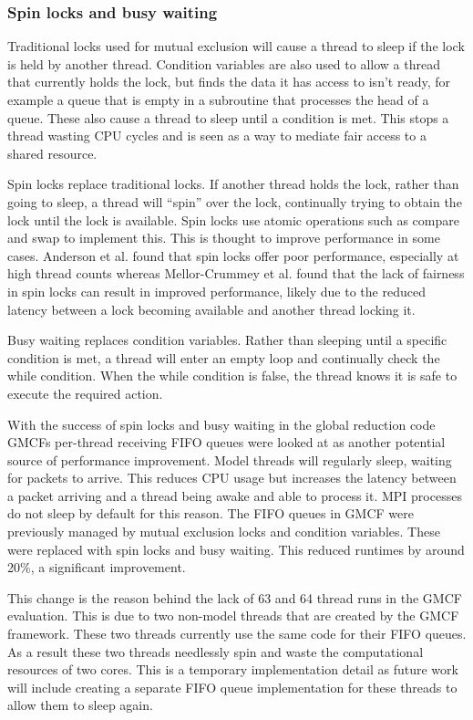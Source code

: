 \subsubsection{Spin locks and busy waiting}

Traditional locks used for mutual exclusion will cause a thread to sleep if the
lock is held by another thread. Condition variables are also used to allow a
thread that currently holds the lock, but finds the data it has access to isn't
ready, for example a queue that is empty in a subroutine that processes the head
of a queue. These also cause a thread to sleep until a condition is met. This
stops a thread wasting CPU cycles and is seen as a way to mediate fair access to
a shared resource.

Spin locks replace traditional locks. If another thread holds the lock, rather
than going to sleep, a thread will ``spin'' over the lock, continually trying to
obtain the lock until the lock is available. Spin locks use atomic operations
such as compare and swap to implement this. This is thought to improve
performance in some cases. Anderson et al. \cite{Anderson1990} found that spin
locks offer poor performance, especially at high thread counts whereas
Mellor-Crummey et al. \cite{Mellor-Crummey1991} found that the lack of fairness
in spin locks can result in improved performance, likely due to the reduced
latency between a lock becoming available and another thread locking it.

Busy waiting replaces condition variables. Rather than sleeping until a specific
condition is met, a thread will enter an empty loop and continually check the
while condition. When the while condition is false, the thread knows it is safe
to execute the required action.

With the success of spin locks and busy waiting in the global reduction code
GMCFs per-thread receiving FIFO queues were looked at as another potential
source of performance improvement. Model threads will regularly sleep, waiting
for packets to arrive. This reduces CPU usage but increases the latency between
a packet arriving and a thread being awake and able to process it. MPI processes
do not sleep by default for this reason. The FIFO queues in GMCF were previously
managed by mutual exclusion locks and condition variables. These were replaced
with spin locks and busy waiting. This reduced runtimes by around 20\%, a
significant improvement.

This change is the reason behind the lack of 63 and 64 thread runs in the GMCF
evaluation. This is due to two non-model threads that are created by the GMCF
framework. These two threads currently use the same code for their FIFO queues.
As a result these two threads needlessly spin and waste the computational
resources of two cores. This is a temporary implementation detail as future work
will include creating a separate FIFO queue implementation for these threads to
allow them to sleep again.

